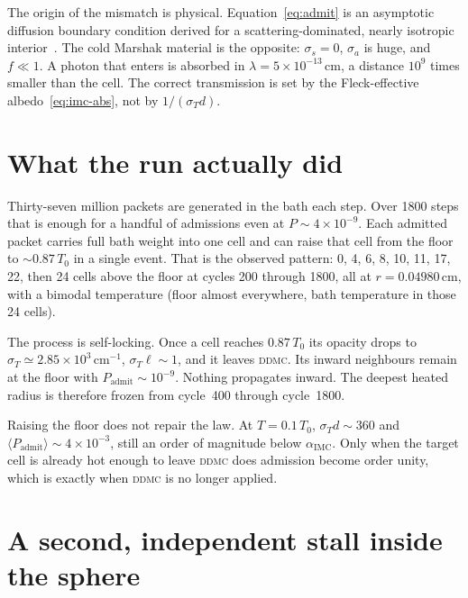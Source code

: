\documentclass[11pt]{article}
\newcommand{\ddmc}{\textsc{ddmc}}
\begin{document}
The origin of the mismatch is physical.
Equation~\eqref{eq:admit} is an asymptotic diffusion boundary condition derived for a scattering-dominated, nearly isotropic interior~\cite{densmore2012,wollaeger2013}.
The cold Marshak material is the opposite: $\sigma_s=0$, $\sigma_a$ is huge, and $f\ll 1$.
A photon that enters is absorbed in $\lambda=5\times 10^{-13}\,\mathrm{cm}$, a distance $10^{9}$ times smaller than the cell.
The correct transmission is set by the Fleck-effective albedo~\eqref{eq:imc-abs}, not by $1/(\sigma_T d)$.

\section{What the run actually did}

Thirty-seven million packets are generated in the bath each step.
Over 1800 steps that is enough for a handful of admissions even at $P\sim 4\times 10^{-9}$.
Each admitted packet carries full bath weight into one cell and can raise that cell from the floor to $\sim 0.87\,T_0$ in a single event.
That is the observed pattern: 0, 4, 6, 8, 10, 11, 17, 22, then 24 cells above the floor at cycles 200 through 1800, all at $r=0.04980\,\mathrm{cm}$, with a bimodal temperature (floor almost everywhere, bath temperature in those 24 cells).

The process is self-locking.
Once a cell reaches $0.87\,T_0$ its opacity drops to $\sigma_T\simeq 2.85\times 10^{3}\,\mathrm{cm}^{-1}$, $\sigma_T\ell\sim 1$, and it leaves \ddmc{}.
Its inward neighbours remain at the floor with $P_{\mathrm{admit}}\sim 10^{-9}$.
Nothing propagates inward.
The deepest heated radius is therefore frozen from cycle~400 through cycle~1800.

Raising the floor does not repair the law.
At $T=0.1\,T_0$, $\sigma_T d\sim 360$ and $\langle P_{\mathrm{admit}}\rangle\sim 4\times 10^{-3}$, still an order of magnitude below $\alpha_{\mathrm{IMC}}$.
Only when the target cell is already hot enough to leave \ddmc{} does admission become order unity, which is exactly when \ddmc{} is no longer applied.

\section{A second, independent stall inside the sphere}
\end{document}
